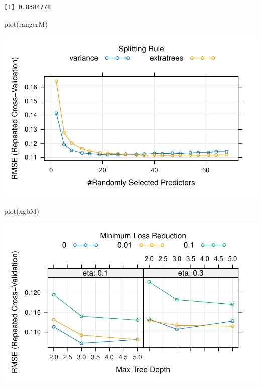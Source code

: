 \documentclass[
  letterpaper,
  DIV=11,
  numbers=noendperiod]{scrreprt}
\newenvironment{Shaded}{\begin{snugshade}}{\end{snugshade}}
\newcommand{\FunctionTok}[1]{\textcolor[rgb]{0.28,0.35,0.67}{#1}}
\newcommand{\NormalTok}[1]{\textcolor[rgb]{0.00,0.23,0.31}{#1}}
\begin{document}
\begin{verbatim}
[1] 0.8384778
\end{verbatim}

\begin{Shaded}
\begin{Highlighting}[]
\FunctionTok{plot}\NormalTok{(rangerM) }
\end{Highlighting}
\end{Shaded}

\includegraphics{03_HyperparameterTuning_files/figure-pdf/unnamed-chunk-5-1.pdf}

\begin{Shaded}
\begin{Highlighting}[]
\FunctionTok{plot}\NormalTok{(xgbM)}
\end{Highlighting}
\end{Shaded}

\includegraphics{03_HyperparameterTuning_files/figure-pdf/unnamed-chunk-5-2.pdf}
\end{document}
